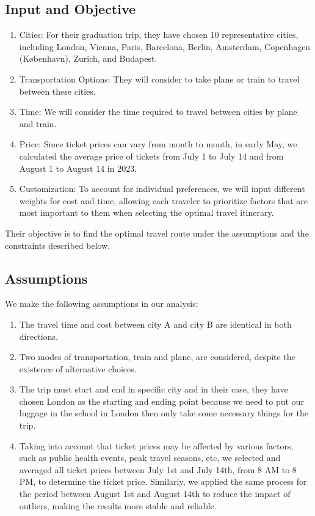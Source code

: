 \documentclass{extarticle}
\begin{document}
\subsection{Input and Objective}

\begin{enumerate}
  \item Cities: For their graduation trip, they have chosen 10 representative cities,
        including London, Vienna, Paris, Barcelona, Berlin, Amsterdam, Copenhagen
        (København), Zurich, and Budapest.
  \item Transportation Options: They will consider to take plane or train to travel
        between these cities.
  \item Time: We will consider the time required to travel between cities by plane and
        train.
  \item Price: Since ticket prices can vary from month to month, in early May, we
        calculated the average price of tickets from July 1 to July 14 and from August
        1 to August 14 in 2023.
  \item Customization: To account for individual preferences, we will input different
        weights for cost and time, allowing each traveler to prioritize factors that
        are most important to them when selecting the optimal travel itinerary.
\end{enumerate}

Their objective is to find the optimal travel route under the assumptions and
the constraints described below.

\subsection{Assumptions}

We make the following assumptions in our analysis:

\begin{enumerate}
  \item The travel time and cost between city A and city B are identical in both
        directions.
  \item Two modes of transportation, train and plane, are considered, despite the
        existence of alternative choices.
  \item The trip must start and end in specific city and in their case, they have
        chosen London as the starting and ending point because we need to put our
        luggage in the school in London then only take some necessary things for the
        trip.
  \item Taking into account that ticket prices may be affected by various factors, such
        as public health events, peak travel seasons, etc, we selected and averaged all
        ticket prices between July 1st and July 14th, from 8 AM to 8 PM, to determine
        the ticket price. Similarly, we applied the same process for the period between
        August 1st and August 14th to reduce the impact of outliers, making the results
        more stable and reliable.\
\end{enumerate}
\end{document}
